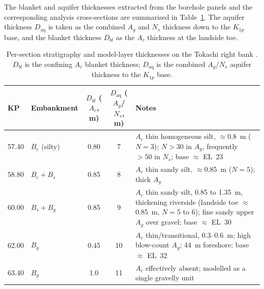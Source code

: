 The blanket and aquifer thicknesses extracted from the borehole panels and the corresponding analysis cross-sections \parencite{oyo_1999} are summarised in Table~\ref{tab:strat_thickness}. The aquifer thickness $D_\mathrm{aq}$ is taken as the combined $A_g$ and $N_s$ thickness down to the $K_{1p}$ base, and the blanket thickness $D_{bl}$ as the $A_c$ thickness at the landside toe.

\begin{table}[htbp]
\centering
\footnotesize
\caption{Per-section stratigraphy and model-layer thicknesses on the Tokachi right bank \parencite{oyo_1999}. $D_{bl}$ is the confining $A_c$ blanket thickness; $D_\mathrm{aq}$ is the combined $A_g$/$N_s$ aquifer thickness to the $K_{1p}$ base.}
\label{tab:strat_thickness}
\begin{tabular}{llccl}
\toprule
KP & Embankment & $D_{bl}$ ($A_c$, m) & $D_\mathrm{aq}$ ($A_g$/$N_s$, m) & Notes \\
\midrule
57.40 & $B_c$ (silty)        & 0.80 & 7  & $A_c$ thin homogeneous silt, $\approx$0.8~m ($N=3$); $N>30$ in $A_g$, frequently $>50$ in $N_s$; base $\approx$ EL~23 \\
58.80 & $B_c + B_s$          & 0.85 & 8  & $A_c$ thin sandy silt, $\approx$0.85~m ($N=5$); thick $A_g$ \\
60.00 & $B_s + B_g$          & 0.85 & 9  & $A_c$ thin sandy silt, 0.85 to 1.35~m, thickening riverside (landside toe $\approx$0.85~m, $N=5$ to 6); fine sandy upper $A_g$ over gravel; base $\approx$ EL~30 \\
62.00 & $B_g$                & 0.45 & 10 & $A_c$ thin/transitional, 0.3--0.6~m; high blow-count $A_g$; 44~m foreshore; base $\approx$ EL~32 \\
63.40 & $B_g$                & 1.0 & 11 & $A_c$ effectively absent; modelled as a single gravelly unit \\
\bottomrule
\end{tabular}
\end{table}

